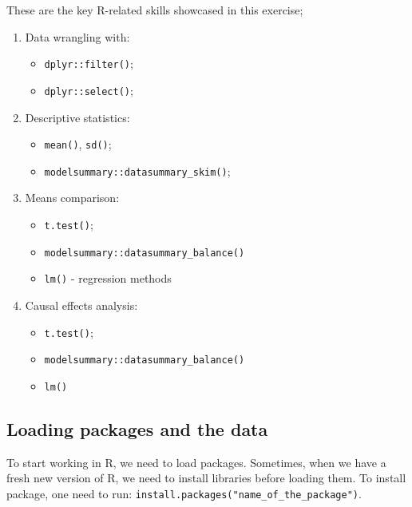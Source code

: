 \documentclass[
  letterpaper,
  DIV=11,
  numbers=noendperiod]{scrartcl}
\providecommand{\tightlist}{%
  \setlength{\itemsep}{0pt}\setlength{\parskip}{0pt}}\usepackage{longtable,booktabs,array}
\begin{document}
These are the key R-related skills showcased in this exercise;

\begin{enumerate}
\def\labelenumi{\arabic{enumi}.}
\item
  Data wrangling with:

  \begin{itemize}
  \tightlist
  \item
    \texttt{dplyr::filter()};
  \item
    \texttt{dplyr::select()};
  \end{itemize}
\item
  Descriptive statistics:

  \begin{itemize}
  \tightlist
  \item
    \texttt{mean()}, \texttt{sd()};
  \item
    \texttt{modelsummary::datasummary\_skim()};
  \end{itemize}
\item
  Means comparison:

  \begin{itemize}
  \tightlist
  \item
    \texttt{t.test()};
  \item
    \texttt{modelsummary::datasummary\_balance()}
  \item
    \texttt{lm()} - regression methods
  \end{itemize}
\item
  Causal effects analysis:

  \begin{itemize}
  \tightlist
  \item
    \texttt{t.test()};
  \item
    \texttt{modelsummary::datasummary\_balance()}
  \item
    \texttt{lm()}
  \end{itemize}
\end{enumerate}

\hypertarget{loading-packages-and-the-data}{%
\subsection{Loading packages and the
data}\label{loading-packages-and-the-data}}

To start working in R, we need to load packages. Sometimes, when we have
a fresh new version of R, we need to install libraries before loading
them. To install package, one need to run:
\texttt{install.packages("name\_of\_the\_package")}.
\end{document}
